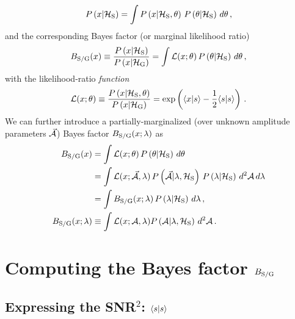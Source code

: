 \documentclass[aps,prd,onecolumn,notitlepage,nofootinbib,superscriptaddress,altaffilletter,floatfix]{revtex4-1}
\begin{document}
\begin{equation}
  \label{eq:6}
  P\left(x|\mathcal{H}_{\mathrm{S}}\right) = \int P\left(x|\mathcal{H}_{\mathrm{S}},\theta\right)\,P\left(\theta|\mathcal{H}_{\mathrm{S}}\right)\,d\theta\,,
\end{equation}
and the corresponding Bayes factor (or marginal likelihood ratio)
\begin{equation}
  \label{eq:7}
  B_{\mathrm{S/G}}(x) \equiv \frac{P\left(x|\mathcal{H}_{\mathrm{S}}\right)}{P\left(x|\mathcal{H}_{\mathrm{G}}\right)} = \int \mathcal{L}(x;\theta)\,P\left(\theta|\mathcal{H}_{\mathrm{S}}\right)\,d\theta\,,
\end{equation}
with the likelihood-ratio \emph{function}
\begin{equation}
  \label{eq:8}
  \mathcal{L}(x;\theta) \equiv \frac{P\left(x|\mathcal{H}_{\mathrm{S}},\theta\right)}{P\left(x|\mathcal{H}_{\mathrm{G}}\right)} = \exp\left(\langle x|s\rangle - \frac{1}{2}\langle s|s\rangle\right)\,.
\end{equation}
We can further introduce a partially-marginalized (over unknown amplitude parameters $\vec{\mathcal{A}}$) Bayes factor $B_{\mathrm{S/G}}(x;\lambda)$ as
\begin{align}
  B_{\mathrm{S/G}}(x) &= \int \mathcal{L}(x;\theta)\,P\left(\theta|\mathcal{H}_{\mathrm{S}}\right)\,d\theta \notag\\
          &= \int \mathcal{L}(x;\vec{\mathcal{A}},\lambda)\,P\left(\vec{\mathcal{A}}|\lambda,\mathcal{H}_{\mathrm{S}}\right)\,P\left(\lambda|\mathcal{H}_{\mathrm{S}}\right)\,d^2\mathcal{A}\,d\lambda \notag\\
          &= \int B_{\mathrm{S/G}}(x;\lambda) \,P\left(\lambda|\mathcal{H}_{\mathrm{S}}\right)\,d\lambda\,,   \label{eq:23a}\\
  B_{\mathrm{S/G}}(x;\lambda) &\equiv \int \mathcal{L}(x;\mathcal{A},\lambda)P\left(\mathcal{A}|\lambda,\mathcal{H}_{\mathrm{S}}\right)\,d^2\mathcal{A}\,.  \label{eq:23b}
\end{align}

\section{Computing the Bayes factor $B_{\mathrm{S/G}}$}
\label{sec:comp-bayes-fact}

\subsection{Expressing the SNR$^2$: $\langle s|s\rangle$}
\label{sec:computing-scalarss}
\end{document}
